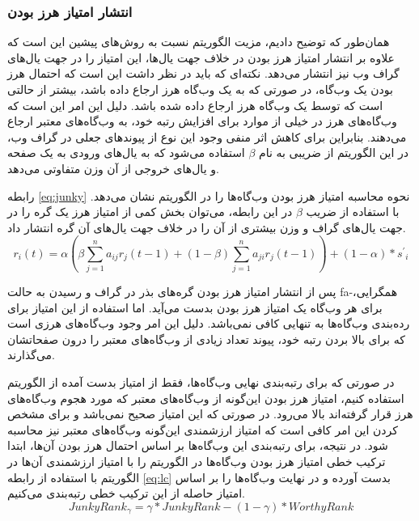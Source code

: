 \documentclass[twoside, a4paper,11pt]{book}
\numberwithin{equation}{chapter}
\numberwithin{table}{chapter}
\numberwithin{figure}{chapter}
\numberwithin{equation}{chapter}
\newcommand{\mls}[1]{\gls{fa-#1}\glsuseri{la-#1}}
\begin{document}
\subsubsection{انتشار امتیاز هرز بودن}

همان‌طور که توضیح دادیم، مزیت الگوریتم  نسبت به روش‌های پیشین این است که علاوه بر انتشار امتیاز هرز بودن در خلاف جهت یال‌ها، این امتیاز را در جهت یال‌های گراف وب نیز انتشار می‌دهد. نکته‌ای که باید در نظر داشت این است که  احتمال هرز بودن یک وب‌گاه، در صورتی که به یک وب‌گاه هرز ارجاع داده باشد، بیشتر از حالتی است که توسط یک وب‌گاه هرز ارجاع داده شده باشد. دلیل این امر این است که وب‌گاه‌های هرز در خیلی از موارد برای افزایش رتبه خود، به وب‌گاه‌های معتبر ارجاع می‌دهند. بنابراین برای کاهش اثر منفی وجود این نوع از پیوندهای جعلی در گراف وب، در این الگوریتم از ضریبی به نام $\beta$ استفاده می‌شود که به یال‌های ورودی به یک صفحه و یال‌های خروجی از آن وزن متفاوتی می‌دهد. 

رابطه \ref{eq:junky} نحوه محاسبه امتیاز هرز بودن وب‌گاه‌ها را در الگوریتم  نشان می‌دهد. با استفاده از ضریب $\beta$ در این رابطه، می‌توان بخش کمی از امتیاز هرز یک گره را در جهت یال‌های گراف و وزن بیشتری از آن را در خلاف جهت یال‌های آن گره انتشار داد.
\begin{equation}
r_{i}(t) = \alpha \left( {\beta \sum\limits_{j=1}^n a_{ij} r_{j}(t-1) + (1-{\beta})  \sum\limits_{j=1}^n a_{ji} r_{j}(t-1)} \right) + (1-{\alpha}) * {s^\prime}_i
	\label{eq:junky}
\end{equation}


پس از انتشار امتیاز هرز بودن گره‌‌های بذر در گراف و رسیدن به حالت \mls{همگرایی}، برای هر وب‌گاه یک امتیاز هرز بودن بدست می‌آید. اما استفاده از این امتیاز برای رده‌بندی وب‌گاه‌ها به تنهایی کافی نمی‌باشد. دلیل این امر وجود وب‌گاه‌های هرزی است که برای بالا بردن رتبه خود، پیوند تعداد زیادی از وب‌گاه‌های معتبر را درون صفحاتشان می‌گذارند. 

در صورتی که برای رتبه‌بندی نهایی وب‌گاه‌ها، فقط از امتیاز بدست آمده از الگوریتم  استفاده کنیم، امتیاز هرز بودن این‌گونه از وب‌گاه‌های معتبر که مورد هجوم وب‌گاه‌های هرز قرار گرفته‌اند بالا می‌رود. در صورتی که این امتیاز صحیح نمی‌باشد و برای مشخص کردن این امر کافی است که امتیاز ارزشمندی این‌گونه وب‌گاه‌های معتبر نیز محاسبه شود. 
در نتیجه، برای رتبه‌بندی این وب‌گاه‌ها بر اساس احتمال هرز بودن آن‌ها، ابتدا ترکیب خطی امتیاز هرز بودن وب‌گاه‌ها در الگوریتم  را با امتیاز ارزشمندی آن‌ها در الگوریتم  با استفاده از رابطه \ref{eq:lc} بدست آورده و در نهایت وب‌گاه‌ها را بر اساس امتیاز حاصله از این ترکیب خطی رتبه‌بندی می‌کنیم.
\begin{equation}
JunkyRank_{\gamma} = \gamma * JunkyRank - (1-{\gamma}) * WorthyRank
	\label{eq:lc}
\end{equation}
\end{document}
